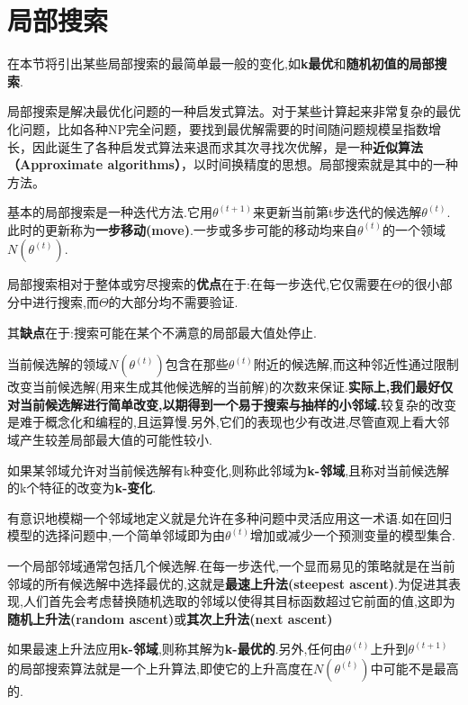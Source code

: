 \documentclass[11pt,a4paper,oneside]{book}
\begin{document}
\section{局部搜索}
在本节将引出某些局部搜索的最简单最一般的变化,如\textbf{k最优}和\textbf{随机初值的局部搜索}.


局部搜索是解决最优化问题的一种启发式算法。对于某些计算起来非常复杂的最优化问题，比如各种NP完全问题，要找到最优解需要的时间随问题规模呈指数增长，因此诞生了各种启发式算法来退而求其次寻找次优解，是一种\textbf{近似算法（Approximate algorithms）}，以时间换精度的思想。局部搜索就是其中的一种方法。

基本的局部搜索是一种迭代方法.它用$ \theta^{(t+1)} $来更新当前第t步迭代的候选解$ \theta^{(t)} $.此时的更新称为\textbf{一步移动(move)}.一步或多步可能的移动均来自$ \theta^{(t)} $的一个领域$ N( \theta^{(t)} ) $.

\begin{tcolorbox}[colback=pink!10!white,colframe=pink!100!black]
局部搜索相对于整体或穷尽搜索的\textbf{优点}在于:在每一步迭代,它仅需要在$ \Theta $的很小部分中进行搜索,而$ \Theta $的大部分均不需要验证.

其\textbf{缺点}在于:搜索可能在某个不满意的局部最大值处停止.
\end{tcolorbox}

当前候选解的领域$ N( \theta^{(t)} ) $包含在那些$ \theta^{(t)} $附近的候选解,而这种邻近性通过限制改变当前候选解(用来生成其他候选解的当前解)的次数来保证.\textbf{实际上,我们最好仅对当前候选解进行简单改变,以期得到一个易于搜索与抽样的小邻域.}较复杂的改变是难于概念化和编程的,且运算慢.另外,它们的表现也少有改进,尽管直观上看大邻域产生较差局部最大值的可能性较小.

如果某邻域允许对当前候选解有k种变化,则称此邻域为\textbf{k-邻域},且称对当前候选解的k个特征的改变为\textbf{k-变化}.

有意识地模糊一个邻域地定义就是允许在多种问题中灵活应用这一术语.如在回归模型的选择问题中,一个简单邻域即为由$ \theta^{(t)} $增加或减少一个预测变量的模型集合.

一个局部邻域通常包括几个候选解.在每一步迭代,一个显而易见的策略就是在当前邻域的所有候选解中选择最优的,这就是\textbf{最速上升法(steepest ascent)}.为促进其表现,人们首先会考虑替换随机选取的邻域以使得其目标函数超过它前面的值,这即为\textbf{随机上升法(random ascent)}或\textbf{其次上升法(next ascent)}

如果最速上升法应用\textbf{k-邻域},则称其解为\textbf{k-最优的}.另外,任何由$ \theta^{(t)} $上升到$ \theta^{(t+1)} $的局部搜索算法就是一个上升算法,即使它的上升高度在$ N( \theta^{(t)}) $中可能不是最高的.
	
\end{document}
